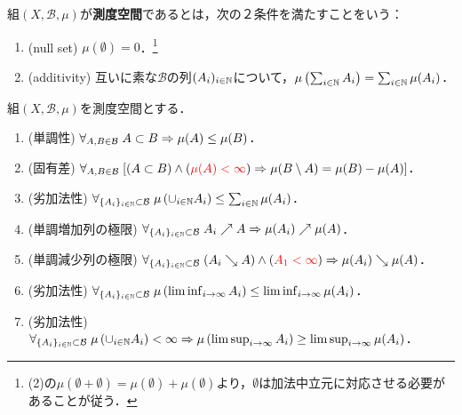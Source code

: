 \documentclass[uplatex, dvipdfmx]{jsreport}
\renewcommand{\B}{\mathcal{B}}
\begin{document}
\begin{definition}
    組$(X,\B,\mu)$が\textbf{測度空間}であるとは，次の２条件を満たすことをいう：
    \begin{enumerate}
        \item (null set) $\mu(\emptyset)=0$．\footnote{(2)の$\mu(\emptyset+\emptyset)=\mu(\emptyset)+\mu(\emptyset)$より，$\emptyset$は加法中立元に対応させる必要があることが従う．}
        \item (additivity) 互いに素な$\B$の列$(A_i)_{i\in\mathbb{N}}$について，$\mu\left(\sum_{i\in\mathbb{N}}A_i\right)=\sum_{i\in\mathbb{N}}\mu(A_i)$．
    \end{enumerate}
\end{definition}

\begin{lemma}[測度の性質]\label{lemma-character-of-measure}
    組$(X,\B,\mu)$を測度空間とする．
    \begin{enumerate}
        \item (単調性) $\forall_{A,B\in\mathcal{B}}\;A\subset B\Rightarrow\mu(A)\le\mu(B)$．
        \item (固有差) $\forall_{A,B\in\mathcal{B}}\;[(A\subset B)\land(\textcolor{red}{\mu(A)<\infty})\Rightarrow\mu(B\setminus A)=\mu(B)-\mu(A)]$．
        \item (劣加法性) $\forall_{\{A_i\}_{i\in\mathbb{N}}\subset\mathcal{B}}\;\mu\left(\cup_{i\in\mathbb{N}}A_i\right)\le\sum_{i\in\mathbb{N}}\mu(A_i)$．
        \item (単調増加列の極限) $\forall_{\{A_i\}_{i\in\mathbb{N}}\subset\mathcal{B}}\;A_i\nearrow A\Rightarrow\mu(A_i)\nearrow\mu(A)$．
        \item (単調減少列の極限) $\forall_{\{A_i\}_{i\in\mathbb{N}}\subset\mathcal{B}}\;(A_i\searrow A)\land(\textcolor{red}{A_1<\infty})\Rightarrow\mu(A_i)\searrow\mu(A)$．
        \item (劣加法性) $\forall_{\{A_i\}_{i\in\mathbb{N}}\subset\mathcal{B}}\;\mu\left(\liminf_{i\to\infty}A_i\right)\le\liminf_{i\to\infty}\mu(A_i)$．
        \item (劣加法性) $\forall_{\{A_i\}_{i\in\mathbb{N}}\subset\mathcal{B}}\;\mu\left(\cup_{i\in\mathbb{N}}A_i\right)<\infty\Rightarrow\mu\left(\limsup_{i\to\infty}A_i\right)\ge\limsup_{i\to\infty}\mu(A_i)$．
    \end{enumerate}
\end{lemma}
\end{document}

